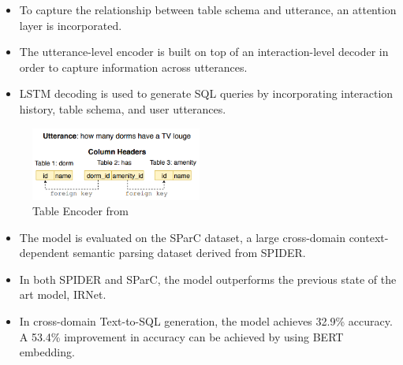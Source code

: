 \begin{itemize}
    \item To capture the relationship between table schema and utterance, an attention layer is incorporated.
    \item The utterance-level encoder is built on top of an interaction-level decoder in order to capture information across utterances.
    \item LSTM decoding is used to generate SQL queries by incorporating interaction history, table schema, and user utterances.
\end{itemize}

\begin{figure}[htb]
    \centering
    \includegraphics[width=0.5\textwidth]{pics/EditSQL/example.png}
    \caption{Table Encoder from \cite{DBLP:journals/corr/abs-1909-00786}}
    \label{fig:EditSQL_example}
\end{figure}

\begin{itemize}
    \item The model is evaluated on the SParC dataset, a large cross-domain context-dependent semantic parsing dataset derived from SPIDER.
    \item In both SPIDER and SParC, the model outperforms the previous state of the art model, IRNet.
    \item In cross-domain Text-to-SQL generation, the model achieves 32.9\% accuracy. A 53.4\% improvement in accuracy can be achieved by using BERT embedding.
\end{itemize}

